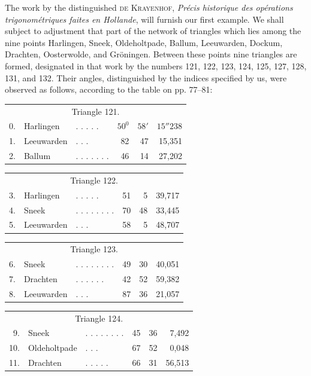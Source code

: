 The work by the distinguished \textsc{de Krayenhof}, \textit{Précis historique des opérations trigonométriques faites en Hollande}, will furnish our first example. We shall subject to adjustment that part of the network of triangles which lies among the nine points Harlingen, Sneek, Oldeholtpade, Ballum, Leeuwarden, Dockum, Drachten, Oosterwolde, and Gröningen. Between these points nine triangles are formed, designated in that work by the numbers 121, 122, 123, 124, 125, 127, 128, 131, and 132. Their angles, distinguished by the indices specified by us, were observed as follows, according to the table on pp. 77–81:
\begin{center}
\begin{tabular}{r l l r r r}
\multicolumn{6}{c}{Triangle 121.}\\[5pt]
0.&Harlingen&. . . . .&\(50^0\)&\(58'\)&\(15''238\)\\
1.&Leeuwarden&. . .&82&47&15,351\\
2.&Ballum&. . . . . . .&46&14&27,202
\end{tabular}
\end{center}
\begin{center}
\begin{tabular}{r l l r r r}
\multicolumn{6}{c}{Triangle 122.}\\[5pt]
3.&Harlingen&. . . . .&51&5&39,717\\
4.&Sneek&. . . . . . . .&70&48&33,445\\
5.&Leeuwarden&. . .&58&5&48,707
\end{tabular}
\end{center}
\begin{center}
\begin{tabular}{r l l r r r}
\multicolumn{6}{c}{Triangle 123.}\\[5pt]
6.&Sneek&. . . . . . . .&49&30&40,051\\
7.&Drachten&. . . . . .&42&52&59,382\\
8.&Leeuwarden&. . .&87&36&21,057
\end{tabular}
\end{center}
\begin{center}
\begin{tabular}{r l l r r r}
\multicolumn{6}{c}{Triangle 124.}\\[5pt]
9.&Sneek&. . . . . . . .&45&36&7,492\\
10.&Oldeholtpade&. . .&67&52&0,048\\
11.&Drachten&. . . . .&66&31&56,513
\end{tabular}
\end{center}
